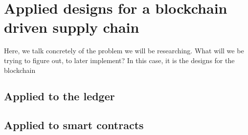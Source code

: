 \chapter{Applied designs for a blockchain driven supply chain}
\label{chap:problem}


Here, we talk concretely of the problem we will be researching. What will we be trying to figure out, to later implement? In this case, it is the designs for the blockchain

\section{Applied to the ledger}

\section{Applied to smart contracts}